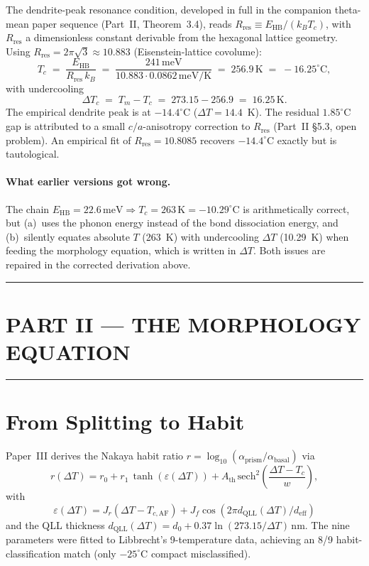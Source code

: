 \documentclass[11pt,a4paper]{article}
\begin{document}
The dendrite-peak resonance condition, developed in full in the
companion theta-mean paper sequence (Part~II, Theorem~3.4),
reads $R_{\text{res}} \equiv E_{\text{HB}}/(k_B T_c)$, with
$R_{\text{res}}$ a dimensionless constant derivable from the
hexagonal lattice geometry.  Using $R_{\text{res}} = 2\pi\sqrt{3}
\approx 10.883$ (Eisenstein-lattice covolume):
\[
T_c \;=\; \frac{E_{\text{HB}}}{R_{\text{res}}\,k_B}
      \;=\; \frac{241\,\mathrm{meV}}{10.883 \cdot 0.0862\,\mathrm{meV/K}}
      \;=\; 256.9\,\mathrm{K}
      \;=\; -16.25^{\circ}\mathrm{C},
\]
with undercooling
\[
\Delta T_c \;=\; T_m - T_c \;=\; 273.15 - 256.9 \;=\; 16.25\,\mathrm{K}.
\]
The empirical dendrite peak is at $-14.4^{\circ}$C
($\Delta T = 14.4$~K).  The residual $1.85^{\circ}$C gap is attributed
to a small $c/a$-anisotropy correction to $R_{\text{res}}$ (Part~II
\S 5.3, open problem).  An empirical fit of $R_{\text{res}} = 10.8085$
recovers $-14.4^{\circ}$C exactly but is tautological.

\paragraph{What earlier versions got wrong.}  The chain
$E_{\text{HB}} = 22.6\,\mathrm{meV} \Rightarrow T_c = 263\,\mathrm{K}
= -10.29^{\circ}\mathrm{C}$ is arithmetically correct, but
(a)~uses the phonon energy instead of the bond dissociation energy,
and (b)~silently equates absolute $T$ (263~K) with undercooling
$\Delta T$ (10.29~K) when feeding the morphology equation, which is
written in $\Delta T$.  Both issues are repaired in the corrected
derivation above.

\hrule\vspace{14pt}

\section*{\centering PART II — THE MORPHOLOGY EQUATION}
\hrule\vspace{12pt}

\section{From Splitting to Habit}
\label{sec:morphology}

Paper~III \cite{PaperIII} derives the Nakaya habit ratio $r = \log_{10}(\alpha_\text{prism}/\alpha_\text{basal})$ via
\begin{equation}
r(\Delta T) = r_0 + r_1\,\tanh(\varepsilon(\Delta T)) + A_\text{th}\,\mathrm{sech}^2\!\left(\frac{\Delta T - T_c}{w}\right),
\label{eq:morph}
\end{equation}
with
\[
\varepsilon(\Delta T) = J_r(\Delta T - T_{c,\text{AF}}) + J_f \cos(2\pi d_\text{QLL}(\Delta T)/d_\text{eff})
\]
and the QLL thickness $d_\text{QLL}(\Delta T) = d_0 + 0.37\ln(273.15/\Delta T)$\,nm. The nine parameters were fitted to Libbrecht's 9-temperature data, achieving an 8/9 habit-classification match (only $-25^\circ$C compact misclassified).
\end{document}

